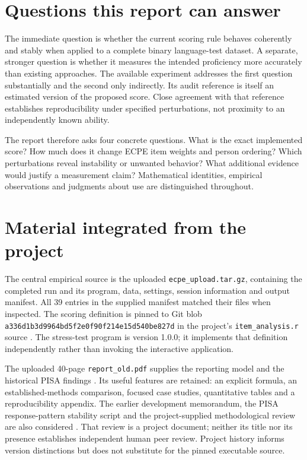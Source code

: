 \documentclass[11pt,a4paper,oneside,headings=normal,parskip=half]{scrreprt}
\newcommand{\code}[1]{\nolinkurl{#1}}
\begin{document}
\section{Questions this report can answer}
The immediate question is whether the current scoring rule behaves coherently and stably when applied to a complete binary language-test dataset. A separate, stronger question is whether it measures the intended proficiency more accurately than existing approaches. The available experiment addresses the first question substantially and the second only indirectly. Its audit reference is itself an estimated version of the proposed score. Close agreement with that reference establishes reproducibility under specified perturbations, not proximity to an independently known ability.

The report therefore asks four concrete questions. What is the exact implemented score? How much does it change ECPE item weights and person ordering? Which perturbations reveal instability or unwanted behavior? What additional evidence would justify a measurement claim? Mathematical identities, empirical observations and judgments about use are distinguished throughout.

\section{Material integrated from the project}
The central empirical source is the uploaded \code{ecpe_upload.tar.gz}, containing the completed run and its program, data, settings, session information and output manifest. All 39 entries in the supplied manifest matched their files when inspected. The scoring definition is pinned to Git blob \code{a336d1b3d9964bd5f2e0f90f214e15d540be827d} in the project's \code{item_analysis.r} source \citep{hellstromsource}. The stress-test program is version 1.0.0; it implements that definition independently rather than invoking the interactive application.

The uploaded 40-page \code{report_old.pdf} supplies the reporting model and the historical PISA findings \citep{oldreport}. Its useful features are retained: an explicit formula, an established-methods comparison, focused case studies, quantitative tables and a reproducibility appendix. The earlier development memorandum, the PISA response-pattern stability script and the project-supplied methodological review are also considered \citep{development,pisascript,projectreview}. That review is a project document; neither its title nor its presence establishes independent human peer review. Project history informs version distinctions but does not substitute for the pinned executable source.
\end{document}
